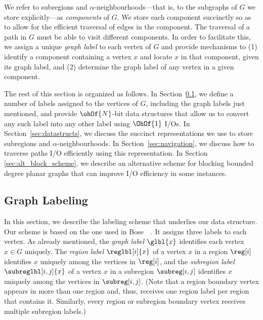 {We refer to subregions and $\alpha$-neighbourhoods---that is, to the
subgraphs of $G$ we store explicitly---as \emph{components} of $G$.
We store each component succinctly so as to allow for the efficient
traversal of edges in the component.
The traversal of a path in $G$ must be able to visit different components.
In order to facilitate this, we assign a unique \emph{graph label} to each vertex of $G$
and provide mechanisms to (1) identify a component containing a vertex $x$ and
locate $x$ in that component, given its graph label, and (2) determine
the graph label of any vertex in a given component.

The rest of this section is organized as follows.
In Section~\ref{sec:graph_labelling}, we define a number of labels
assigned to the vertices of $G$, including the graph labels just
mentioned, and provide $\ohOf{N}$-bit data structures that allow us to
convert any such label into any other label using $\OhOf{1}$ I/Os.
In Section~\ref{sec:datastructs}, we discuss the succinct
representations we use to store subregions and
$\alpha$-neighbourhoods.
In Section~\ref{sec:navigation},
we discuss how to traverse paths I/O efficiently using this
representation.
In Section \ref{sec:alt_block_scheme}, we describe an 
alternative scheme
for blocking bounded degree planar graphs that can improve I/O efficiency in 
some instances.

\subsection{Graph Labeling}

\label{sec:graph_labelling}

In this section, we describe the labeling scheme that underlies our
data structure.
Our scheme is based on the one used in
Bose~\etal~\cite{DBLP:journals/talg/BoseCHMM12}.
It assigns three labels to each vertex.
As already mentioned, the \emph{graph label} $\glbl{x}$ identifies each vertex
$x \in G$ uniquely.
The \emph{region label} $\reglbl[i]{x}$ of a vertex $x$ in a region $\reg[i]$
identifies $x$ uniquely among the vertices in $\reg[i]$, and the
\emph{subregion label} $\subreglbl[i,j]{x}$ of a vertex $x$ in a subregion
$\subreg[i,j]$ identifies $x$ uniquely
among the vertices in $\subreg[i,j]$.
(Note that a region boundary vertex appears in more than one region and,
thus, receives one region label per region that contains it.
Similarly, every region or subregion boundary vertex receives multiple
subregion labels.)

}
